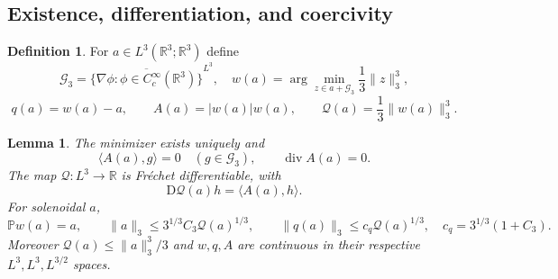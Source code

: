 \documentclass[11pt,a4paper]{article}
\newtheorem{lemma}[theorem]{Lemma}
\theoremstyle{definition}\newtheorem{definition}[theorem]{Definition}
\theoremstyle{remark}\newtheorem{remark}[theorem]{Remark}
\newcommand{\R}{\mathbb R}
\newcommand{\G}{\mathcal G_3}
\newcommand{\Q}{\mathcal Q}
\newcommand{\PP}{\mathbb P}
\newcommand{\norm}[1]{\lVert #1\rVert}
\newcommand{\ip}[2]{\langle #1,#2\rangle}
\newcommand{\diver}{\operatorname{div}}
\numberwithin{equation}{section}
\begin{document}
\subsection{Existence, differentiation, and coercivity}
\begin{definition}
For $a\in L^3(\R^3;\R^3)$ define
\begin{equation}\label{eq:quotientdef}
 \G=\overline{\{\nabla\phi:\phi\in C_c^\infty(\R^3)\}}^{L^3},\quad
 w(a)=\arg\min_{z\in a+\G}\frac13\norm z_3^3,
\end{equation}
\begin{equation}\label{eq:objects}
 q(a)=w(a)-a,\qquad A(a)=|w(a)|w(a),\qquad
 \Q(a)=\frac13\norm{w(a)}_3^3.
\end{equation}
\end{definition}
\begin{lemma}\label{lem:basic}
The minimizer exists uniquely and
\begin{equation}\label{eq:stationarity}
 \ip{A(a)}g=0\quad(g\in\G),\qquad \diver A(a)=0.
\end{equation}
The map $\Q:L^3\to\R$ is Fr\'echet differentiable, with
\begin{equation}\label{eq:DQ}
 \mathrm D\Q(a)h=\ip{A(a)}h.
\end{equation}
For solenoidal $a$,
\begin{equation}\label{eq:coercive}
 \PP w(a)=a,\qquad
 \norm a_3\le 3^{1/3}C_3\Q(a)^{1/3},\qquad
 \norm{q(a)}_3\le c_q\Q(a)^{1/3},
 \quad c_q=3^{1/3}(1+C_3).
\end{equation}
Moreover $\Q(a)\le\norm a_3^3/3$ and $w,q,A$ are continuous in their respective $L^3,L^3,L^{3/2}$ spaces.
\end{lemma}
\end{document}
